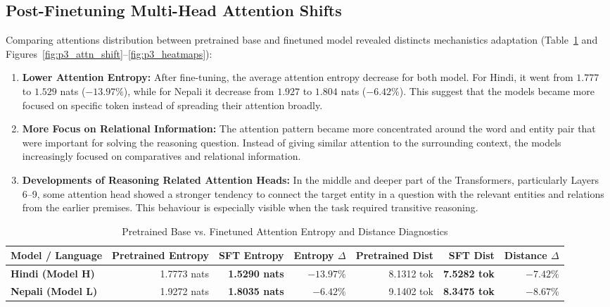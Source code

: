 \documentclass[10pt,a4paper]{article}
\begin{document}
\subsection{Post-Finetuning Multi-Head Attention Shifts}
Comparing attentions distribution between pretrained base and finetuned model revealed distincts mechanistics adaptation (Table~\ref{tab:attention_shift_table} and Figures~\ref{fig:p3_attn_shift}--\ref{fig:p3_heatmaps}):
\begin{enumerate}
    \item \textbf{Lower Attention Entropy:} After fine-tuning, the average
    attention entropy decrease for both model. For Hindi, it went from
    $1.777$ to $1.529$ nats ($-13.97\%$), while for Nepali it decrease from
    $1.927$ to $1.804$ nats ($-6.42\%$). This suggest that the models became
    more focused on specific token instead of spreading their attention
    broadly.

    \item \textbf{More Focus on Relational Information:} The attention
    pattern became more concentrated around the word and entity pair that
    were important for solving the reasoning question. Instead of giving
    similar attention to the surrounding context, the models increasingly
    focused on comparatives and relational information.

    \item \textbf{Developments of Reasoning Related Attention Heads:} In the
    middle and deeper part of the Transformers, particularly Layers 6--9,
    some attention head showed a stronger tendency to connect the target
    entity in a question with the relevant entities and relations from the
    earlier premises. This behaviour is especially visible when the task
    required transitive reasoning.
\end{enumerate}

\begin{table}[htbp]
\centering
\scriptsize
\caption{Pretrained Base vs. Finetuned Attention Entropy and Distance Diagnostics}
\label{tab:attention_shift_table}
\begin{tabular*}{\textwidth}{@{\extracolsep{\fill}}lrrrrrr@{}}
\toprule
\textbf{Model / Language} & \textbf{Pretrained Entropy} & \textbf{SFT Entropy} & \textbf{Entropy $\Delta$} & \textbf{Pretrained Dist} & \textbf{SFT Dist} & \textbf{Distance $\Delta$} \\
\midrule
\textbf{Hindi (Model H)} & 1.7773 nats & \textbf{1.5290 nats} & \textbf{$-13.97\%$} & 8.1312 tok & \textbf{7.5282 tok} & \textbf{$-7.42\%$} \\
\textbf{Nepali (Model L)} & 1.9272 nats & \textbf{1.8035 nats} & \textbf{$-6.42\%$} & 9.1402 tok & \textbf{8.3475 tok} & \textbf{$-8.67\%$} \\
\bottomrule
\end{tabular*}
\end{table}
\end{document}
